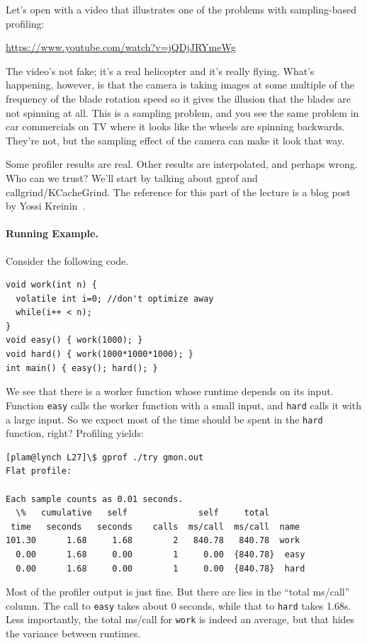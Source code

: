 \documentclass[a4paper]{report}
\begin{document}
Let's open with a video that illustrates one of the problems with sampling-based profiling:

\begin{center}
	\url{https://www.youtube.com/watch?v=jQDjJRYmeWg}
\end{center}

The video's not fake; it's a real helicopter and it's really flying. What's happening, however, is that the camera is taking images at some multiple of the frequency of the blade rotation speed so it gives the illusion that the blades are not spinning at all. This is a sampling problem, and you see the same problem in car commercials on TV where it looks like the wheels are spinning backwards. They're not, but the sampling effect of the camera can make it look that way.

Some profiler results are real.  Other results are interpolated, and
perhaps wrong. Who can we trust? We'll start by talking about gprof and callgrind/KCacheGrind. The reference for this part of the lecture is a blog post by Yossi Kreinin~\cite{lies}.

\paragraph{Running Example.} Consider the following code.

\begin{lstlisting}
void work(int n) {
  volatile int i=0; //don't optimize away
  while(i++ < n);
}
void easy() { work(1000); }
void hard() { work(1000*1000*1000); }
int main() { easy(); hard(); }
\end{lstlisting}

We see that there is a worker function whose runtime depends on its input.
Function {\tt easy} calls the worker function with a small input, and {\tt hard} calls
it with a large input. So we expect most of the time should be spent in the \texttt{hard} function, right? 
Profiling yields:
\begin{verbatim}
[plam@lynch L27]\$ gprof ./try gmon.out
Flat profile:

Each sample counts as 0.01 seconds.
  \%   cumulative   self              self     total           
 time   seconds   seconds    calls  ms/call  ms/call  name    
101.30      1.68     1.68        2   840.78   840.78  work
  0.00      1.68     0.00        1     0.00  {840.78}  easy
  0.00      1.68     0.00        1     0.00  {840.78}  hard
\end{verbatim}
Most of the profiler output is just fine. But there are lies in the
``total ms/call'' column. The call to {\tt easy} takes about 0 seconds,
while that to {\tt hard} takes 1.68s. Less importantly, the total ms/call for
{\tt work} is indeed an average, but that hides the variance between runtimes.
\end{document}
